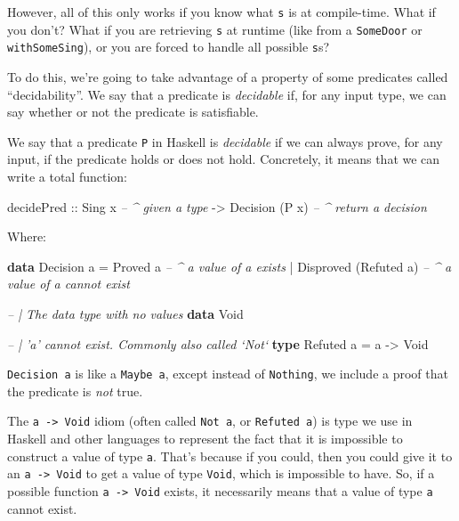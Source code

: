 \documentclass[]{article}
\newenvironment{Shaded}{}{}
\newcommand{\CommentTok}[1]{\textcolor[rgb]{0.38,0.63,0.69}{\textit{#1}}}
\newcommand{\DataTypeTok}[1]{\textcolor[rgb]{0.56,0.13,0.00}{#1}}
\newcommand{\FunctionTok}[1]{\textcolor[rgb]{0.02,0.16,0.49}{#1}}
\newcommand{\KeywordTok}[1]{\textcolor[rgb]{0.00,0.44,0.13}{\textbf{#1}}}
\newcommand{\NormalTok}[1]{#1}
\newcommand{\OtherTok}[1]{\textcolor[rgb]{0.00,0.44,0.13}{#1}}
\begin{document}
However, all of this only works if you know what \texttt{s} is at compile-time.
What if you don't? What if you are retrieving \texttt{s} at runtime (like from a
\texttt{SomeDoor} or \texttt{withSomeSing}), or you are forced to handle all
possible \texttt{s}s?

To do this, we're going to take advantage of a property of some predicates
called ``decidability''. We say that a predicate is \emph{decidable} if, for any
input type, we can say whether or not the predicate is satisfiable.

We say that a predicate \texttt{P} in Haskell is \emph{decidable} if we can
always prove, for any input, if the predicate holds or does not hold.
Concretely, it means that we can write a total function:

\begin{Shaded}
\begin{Highlighting}[]
\NormalTok{decidePred}
\OtherTok{    ::} \DataTypeTok{Sing}\NormalTok{ x               }\CommentTok{-- ^ given a type}
    \OtherTok{->} \DataTypeTok{Decision}\NormalTok{ (}\DataTypeTok{P}\NormalTok{ x)       }\CommentTok{-- ^ return a decision}
\end{Highlighting}
\end{Shaded}

Where:

\begin{Shaded}
\begin{Highlighting}[]
\KeywordTok{data} \DataTypeTok{Decision}\NormalTok{ a }\FunctionTok{=} \DataTypeTok{Proved}\NormalTok{ a                  }\CommentTok{-- ^ a value of a exists}
                \FunctionTok{|} \DataTypeTok{Disproved}\NormalTok{ (}\DataTypeTok{Refuted}\NormalTok{ a)     }\CommentTok{-- ^ a value of a cannot exist}

\CommentTok{-- | The data type with no values}
\KeywordTok{data} \DataTypeTok{Void}

\CommentTok{-- | 'a' cannot exist.  Commonly also called `Not`}
\KeywordTok{type} \DataTypeTok{Refuted}\NormalTok{ a }\FunctionTok{=}\NormalTok{ a }\OtherTok{->} \DataTypeTok{Void}
\end{Highlighting}
\end{Shaded}

\texttt{Decision\ a} is like a \texttt{Maybe\ a}, except instead of
\texttt{Nothing}, we include a proof that the predicate is \emph{not} true.

The \texttt{a\ -\textgreater{}\ Void} idiom (often called \texttt{Not\ a}, or
\texttt{Refuted\ a}) is type we use in Haskell and other languages to represent
the fact that it is impossible to construct a value of type \texttt{a}. That's
because if you could, then you could give it to an
\texttt{a\ -\textgreater{}\ Void} to get a value of type \texttt{Void}, which is
impossible to have. So, if a possible function \texttt{a\ -\textgreater{}\ Void}
exists, it necessarily means that a value of type \texttt{a} cannot exist.
\end{document}
